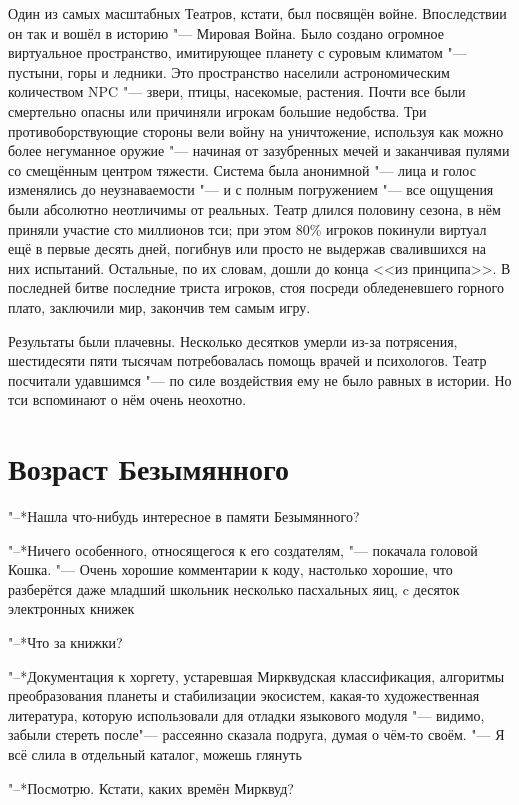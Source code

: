 \documentclass[a4paper,10pt]{book}
\newcommand{\ldotst}{\so{...}\xspace}
\begin{document}
 Один из самых масштабных Театров, кстати, был посвящён войне. Впоследствии он так и вошёл в историю "--- Мировая Война. Было создано огромное виртуальное пространство, имитирующее планету с суровым климатом "--- пустыни, горы и ледники. Это пространство населили астрономическим количеством NPC "--- звери, птицы, насекомые, растения. Почти все были смертельно опасны или причиняли игрокам большие недобства. Три противоборствующие стороны вели войну на уничтожение, используя как можно более негуманное оружие "--- начиная от зазубренных мечей и заканчивая пулями со смещённым центром тяжести. Система была анонимной "--- лица и голос изменялись до неузнаваемости "--- и с полным погружением "--- все ощущения были абсолютно неотличимы от реальных. Театр длился половину сезона, в нём приняли участие сто миллионов тси; при этом 80\% игроков покинули виртуал ещё в первые десять дней, погибнув или просто не выдержав свалившихся на них испытаний. Остальные, по их словам, дошли до конца <<из принципа>>. В последней битве последние триста игроков, стоя посреди обледеневшего горного плато, заключили мир, закончив тем самым игру.

Результаты были плачевны. Несколько десятков умерли из-за потрясения, шестидесяти пяти тысячам потребовалась помощь врачей и психологов. Театр посчитали удавшимся "--- по силе воздействия ему не было равных в истории. Но тси вспоминают о нём очень неохотно.

 \section{Возраст Безымянного}

 "--*Нашла что-нибудь интересное в памяти Безымянного?

"--*Ничего особенного, относящегося к его создателям, "--- покачала головой Кошка. "--- Очень хорошие комментарии к коду, настолько хорошие, что разберётся даже младший школьник\ldotst несколько пасхальных яиц, c десяток электронных книжек\ldotst

"--*Что за книжки?

"--*Документация к хоргету, устаревшая Мирквудская классификация, алгоритмы преобразования планеты и стабилизации экосистем, какая-то художественная литература, которую использовали для отладки языкового модуля "--- видимо, забыли стереть после\ldotst "--- рассеянно сказала подруга, думая о чём-то своём. "--- Я всё слила в отдельный каталог, можешь глянуть\ldotst

"--*Посмотрю. Кстати, каких времён Мирквуд?
\end{document}
